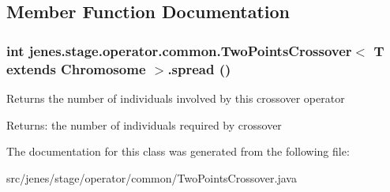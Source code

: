 \subsection{Member Function Documentation}
\hypertarget{classjenes_1_1stage_1_1operator_1_1common_1_1_two_points_crossover_3_01_t_01extends_01_chromosome_01_4_30115e5f2250765209bed48bda1e5155}{
\subsubsection[spread]{\setlength{\rightskip}{0pt plus 5cm}int jenes.stage.operator.common.TwoPointsCrossover$<$ T extends Chromosome $>$.spread ()}}
\label{classjenes_1_1stage_1_1operator_1_1common_1_1_two_points_crossover_3_01_t_01extends_01_chromosome_01_4_30115e5f2250765209bed48bda1e5155}


Returns the number of individuals involved by this crossover operator 

\begin{Desc}
\item[Returns:]the number of individuals required by crossover \end{Desc}


The documentation for this class was generated from the following file:\begin{CompactItemize}
\item 
src/jenes/stage/operator/common/TwoPointsCrossover.java\end{CompactItemize}
